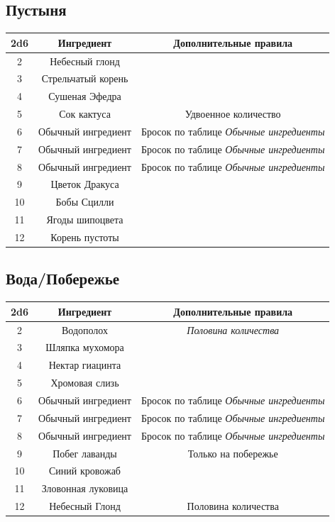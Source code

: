 \documentclass[a4paper, 9pt, twocolumn]{book}
\begin{document}
\subsection{Пустыня}

\begin{tabular}{|c|c|c|}
	\hline
	\textbf{2d6} & \textbf{Ингредиент} & \textbf{Дополнительные правила} \\
	\hline
	2 & Небесный глонд &  \\
	\hline
	3 & Стрельчатый корень &  \\
	\hline
	4 & Сушеная Эфедра &  \\
	\hline
	5 & Сок кактуса & Удвоенное количество \\
	\hline
	6 & Обычный ингредиент & Бросок по таблице \textit{Обычные ингредиенты} \\
	\hline
	7 & Обычный ингредиент & Бросок по таблице \textit{Обычные ингредиенты} \\
	\hline
	8 & Обычный ингредиент & Бросок по таблице \textit{Обычные ингредиенты} \\
	\hline
	9 & Цветок Дракуса &  \\
	\hline
	10 & Бобы Сцилли &  \\
	\hline
	11 & Ягоды шипоцвета &  \\
	\hline
	12 & Корень пустоты &  \\
	\hline
\end{tabular}

\subsection{Вода/Побережье}

\begin{tabular}{|c|c|c|}
	\hline
	\textbf{2d6} & \textbf{Ингредиент} & \textbf{Дополнительные правила} \\
	\hline
	2 & Водополох & \textit{Половина количества} \\
	\hline
	3 & Шляпка мухомора &  \\
	\hline
	4 & Нектар гиацинта &  \\
	\hline
	5 & Хромовая слизь &  \\
	\hline
	6 & Обычный ингредиент & Бросок по таблице \textit{Обычные ингредиенты} \\
	\hline
	7 & Обычный ингредиент & Бросок по таблице \textit{Обычные ингредиенты} \\
	\hline
	8 & Обычный ингредиент & Бросок по таблице \textit{Обычные ингредиенты} \\
	\hline
	9 & Побег лаванды & Только на побережье \\
	\hline
	10 & Синий кровожаб &  \\
	\hline
	11 & Зловонная луковица &  \\
	\hline
	12 & Небесный Глонд & Половина количества \\
	\hline
\end{tabular}
\end{document}
